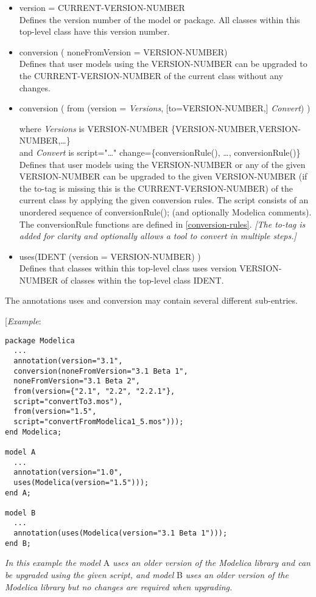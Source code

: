 \begin{itemize}
\item
  version = CURRENT-VERSION-NUMBER\\
  Defines the version number of the model or package. All classes within
  this top-level class have this version number.
\item
  conversion ( noneFromVersion = VERSION-NUMBER)\\
  Defines that user models using the VERSION-NUMBER can be upgraded to
  the CURRENT-VERSION-NUMBER of the current class without any changes.
\item
  conversion ( from (version = \emph{Versions}, {[}to=VERSION-NUMBER,{]}
  \emph{Convert}) )

  where \emph{Versions} is VERSION-NUMBER \textbar{}
  \{VERSION-NUMBER,VERSION-NUMBER,\ldots{}\}\\
  and \emph{Convert} is script="\ldots{}" \textbar{}
  change=\{conversionRule(), \ldots{}, conversionRule()\}\\
  Defines that user models using the VERSION-NUMBER or any of the given
  VERSION-NUMBER can be upgraded to the given VERSION-NUMBER (if the
  to-tag is missing this is the CURRENT-VERSION-NUMBER) of the current
  class by applying the given conversion rules. The script consists of
  an unordered sequence of conversionRule(); (and optionally Modelica
  comments). The conversionRule functions are defined in \ref{conversion-rules}.
  \emph{{[}The to-tag is added for clarity and optionally allows a tool
  to convert in multiple steps.{]}}
\item
  uses(IDENT (version = VERSION-NUMBER) )\\
  Defines that classes within this top-level class uses version
  VERSION-NUMBER of classes within the top-level class IDENT.
\end{itemize}

The annotations uses and conversion may contain several different
sub-entries.

{[}\emph{Example}:

\begin{lstlisting}[language=modelica]
package Modelica
  ...
  annotation(version="3.1",
  conversion(noneFromVersion="3.1 Beta 1",
  noneFromVersion="3.1 Beta 2",
  from(version={"2.1", "2.2", "2.2.1"},
  script="convertTo3.mos"),
  from(version="1.5",
  script="convertFromModelica1_5.mos")));
end Modelica;

model A
  ...
  annotation(version="1.0",
  uses(Modelica(version="1.5")));
end A;

model B
  ...
  annotation(uses(Modelica(version="3.1 Beta 1")));
end B;
\end{lstlisting}
\emph{In this example the model} A \emph{uses an older version of the
Modelica library and can be upgraded using the given script, and model}
B \emph{uses an older version of the Modelica library but no changes are
required when upgrading. }


